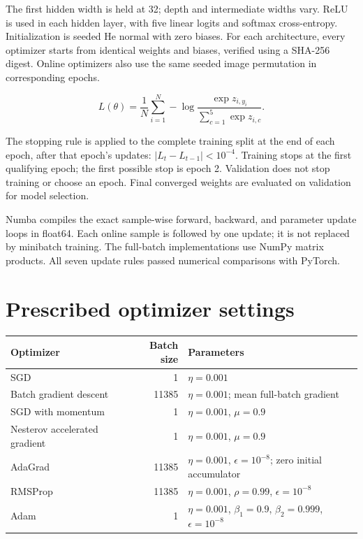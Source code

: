 \documentclass[11pt,a4paper]{article}
\begin{document}
The first hidden width is held at 32; depth and intermediate widths vary. ReLU is used in each hidden layer, with five linear logits and softmax cross-entropy. Initialization is seeded He normal with zero biases. For each architecture, every optimizer starts from identical weights and biases, verified using a SHA-256 digest. Online optimizers also use the same seeded image permutation in corresponding epochs.


\[L(\theta)=\frac{1}{N}\sum_{i=1}^{N}-\log\frac{\exp z_{i,y_i}}{\sum_{c=1}^{5}\exp z_{i,c}}.\]

The stopping rule is applied to the complete training split at the end of each epoch, after that epoch's updates: $|L_t-L_{t-1}|<10^{-4}$. Training stops at the first qualifying epoch; the first possible stop is epoch 2. Validation does not stop training or choose an epoch. Final converged weights are evaluated on validation for model selection.


Numba compiles the exact sample-wise forward, backward, and parameter update loops in float64. Each online sample is followed by one update; it is not replaced by minibatch training. The full-batch implementations use NumPy matrix products. All seven update rules passed numerical comparisons with PyTorch.


\clearpage

\section{Prescribed optimizer settings}

\begingroup\small\setlength{\tabcolsep}{5pt}

\begin{tabularx}{\linewidth}{YrY}

\toprule

\textbf{Optimizer} & \textbf{Batch size} & \textbf{Parameters} \\

\midrule

SGD & 1 & $\eta=0.001$ \\

Batch gradient descent & 11385 & $\eta=0.001$; mean full-batch gradient \\

SGD with momentum & 1 & $\eta=0.001$, $\mu=0.9$ \\

Nesterov accelerated gradient & 1 & $\eta=0.001$, $\mu=0.9$ \\

AdaGrad & 11385 & $\eta=0.001$, $\epsilon=10^{-8}$; zero initial accumulator \\

RMSProp & 11385 & $\eta=0.001$, $\rho=0.99$, $\epsilon=10^{-8}$ \\

Adam & 1 & $\eta=0.001$, $\beta_1=0.9$, $\beta_2=0.999$, $\epsilon=10^{-8}$ \\

\bottomrule\end{tabularx}\endgroup\par\medskip
\end{document}
